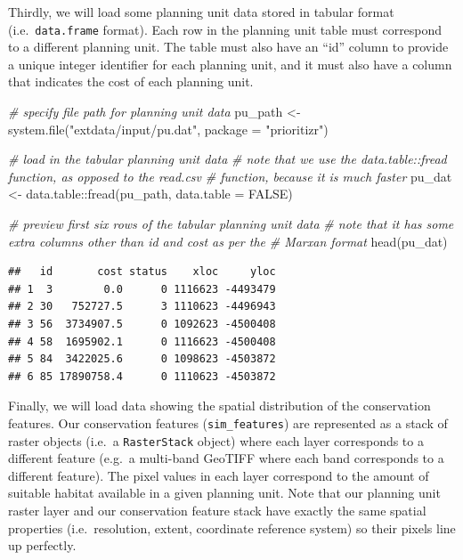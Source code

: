 \documentclass[
  12pt,
]{book}
\newenvironment{Shaded}{\begin{snugshade}}{\end{snugshade}}
\newcommand{\AttributeTok}[1]{\textcolor[rgb]{0.77,0.63,0.00}{#1}}
\newcommand{\CommentTok}[1]{\textcolor[rgb]{0.56,0.35,0.01}{\textit{#1}}}
\newcommand{\ConstantTok}[1]{\textcolor[rgb]{0.00,0.00,0.00}{#1}}
\newcommand{\FunctionTok}[1]{\textcolor[rgb]{0.00,0.00,0.00}{#1}}
\newcommand{\NormalTok}[1]{#1}
\newcommand{\OtherTok}[1]{\textcolor[rgb]{0.56,0.35,0.01}{#1}}
\newcommand{\SpecialCharTok}[1]{\textcolor[rgb]{0.00,0.00,0.00}{#1}}
\newcommand{\StringTok}[1]{\textcolor[rgb]{0.31,0.60,0.02}{#1}}
\begin{document}
Thirdly, we will load some planning unit data stored in tabular format (i.e.~\texttt{data.frame} format). Each row in the planning unit table must correspond to a different planning unit. The table must also have an ``id'' column to provide a unique integer identifier for each planning unit, and it must also have a column that indicates the cost of each planning unit.

\begin{Shaded}
\begin{Highlighting}[]
\CommentTok{\# specify file path for planning unit data}
\NormalTok{pu\_path }\OtherTok{\textless{}{-}} \FunctionTok{system.file}\NormalTok{(}\StringTok{"extdata/input/pu.dat"}\NormalTok{, }\AttributeTok{package =} \StringTok{"prioritizr"}\NormalTok{)}

\CommentTok{\# load in the tabular planning unit data}
\CommentTok{\# note that we use the data.table::fread function, as opposed to the read.csv}
\CommentTok{\# function, because it is much faster}
\NormalTok{pu\_dat }\OtherTok{\textless{}{-}}\NormalTok{ data.table}\SpecialCharTok{::}\FunctionTok{fread}\NormalTok{(pu\_path, }\AttributeTok{data.table =} \ConstantTok{FALSE}\NormalTok{)}

\CommentTok{\# preview first six rows of the tabular planning unit data}
\CommentTok{\# note that it has some extra columns other than id and cost as per the}
\CommentTok{\# Marxan format}
\FunctionTok{head}\NormalTok{(pu\_dat)}
\end{Highlighting}
\end{Shaded}

\begin{verbatim}
##   id       cost status    xloc     yloc
## 1  3        0.0      0 1116623 -4493479
## 2 30   752727.5      3 1110623 -4496943
## 3 56  3734907.5      0 1092623 -4500408
## 4 58  1695902.1      0 1116623 -4500408
## 5 84  3422025.6      0 1098623 -4503872
## 6 85 17890758.4      0 1110623 -4503872
\end{verbatim}

Finally, we will load data showing the spatial distribution of the conservation features. Our conservation features (\texttt{sim\_features}) are represented as a stack of raster objects (i.e.~a \texttt{RasterStack} object) where each layer corresponds to a different feature (e.g.~a multi-band GeoTIFF where each band corresponds to a different feature). The pixel values in each layer correspond to the amount of suitable habitat available in a given planning unit. Note that our planning unit raster layer and our conservation feature stack have exactly the same spatial properties (i.e.~resolution, extent, coordinate reference system) so their pixels line up perfectly.
\end{document}
